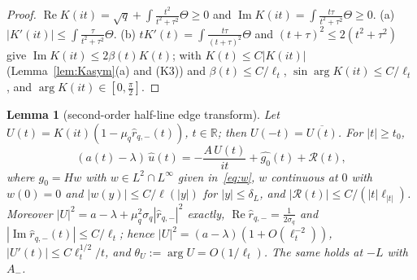 \documentclass[11pt]{amsart}
\newcommand{\R}{\mathbb{R}}
\DeclareMathOperator{\re}{Re}
\DeclareMathOperator{\im}{Im}
\newtheorem{lemma}[theorem]{Lemma}
\theoremstyle{definition}
\theoremstyle{remark}
\numberwithin{equation}{section}
\begin{document}
\begin{proof}
$\re K(it)=\sqrt q+\int\frac{t^2}{t^2+\tau^2}\Theta\ge0$ and $\im K(it)=\int\frac{t\tau}{t^2+\tau^2}\Theta\ge0$. (a) $|K'(it)|\le\int\frac\tau{t^2+\tau^2}\Theta$. (b) $tK'(t)=\int\frac{t\tau}{(t+\tau)^2}\Theta$ and $(t+\tau)^2\le2(t^2+\tau^2)$ give $\im K(it)\le2\beta(t)K(t)$; with $K(t)\le C|K(it)|$ (Lemma~\ref{lem:Kasym}(a) and (K3)) and $\beta(t)\le C/\ell_t$, $\sin\arg K(it)\le C/\ell_t$, and $\arg K(it)\in[0,\frac\pi2]$.
\end{proof}

\begin{lemma}[second-order half-line edge transform]\label{lem:edgeT}
Let $U(t)=K(it)(1-\mu_q\hat r_{q,-}(t))$, $t\in\R$; then $U(-t)=\overline{U(t)}$. For $|t|\ge t_0$,
\begin{equation}\label{eq:edgeT}
(a(t)-\lambda)\,\hat u(t)=-\frac{A\,U(t)}{it}+\widehat{g_0}(t)+\mathcal R(t),
\end{equation}
where $g_0=Hw$ with $w\in L^2\cap L^\infty$ given in~\eqref{eq:w}, $w$ continuous at $0$ with $w(0)=0$ and $|w(y)|\le C/\ell(|y|)$ for $|y|\le\delta_L$, and $|\mathcal R(t)|\le C/(|t|\ell_{|t|})$. Moreover $|U|^2=a-\lambda+\mu_q^2\sigma_q|\hat r_{q,-}|^2$ exactly, $\re\hat r_{q,-}=\frac1{2\sigma_q}$ and $|\im\hat r_{q,-}(t)|\le C/\ell_t$; hence $|U|^2=(a-\lambda)(1+O(\ell_t^{-2}))$, $|U'(t)|\le C\ell_t^{1/2}/t$, and $\theta_U:=\arg U=O(1/\ell_t)$. The same holds at $-L$ with $A_-$.
\end{lemma}
\end{document}
